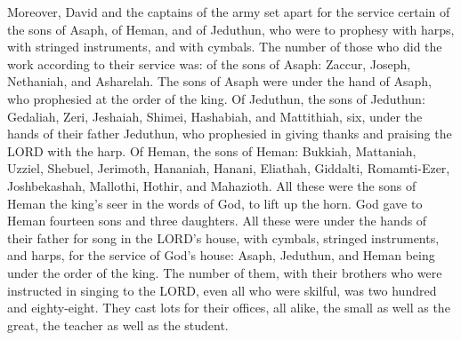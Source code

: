  Moreover, David and the captains of the army set apart for
the service certain of the sons of Asaph, of Heman, and of Jeduthun, who
were to prophesy with harps, with stringed instruments, and with
cymbals. The number of those who did the work according to their service
was:  of the sons of Asaph: Zaccur, Joseph, Nethaniah, and
Asharelah. The sons of Asaph were under the hand of Asaph, who
prophesied at the order of the king.  Of Jeduthun, the sons
of Jeduthun: Gedaliah, Zeri, Jeshaiah, Shimei, Hashabiah, and
Mattithiah, six, under the hands of their father Jeduthun, who
prophesied in giving thanks and praising the LORD with the harp.
 Of Heman, the sons of Heman: Bukkiah, Mattaniah, Uzziel,
Shebuel, Jerimoth, Hananiah, Hanani, Eliathah, Giddalti, Romamti-Ezer,
Joshbekashah, Mallothi, Hothir, and Mahazioth.  All these
were the sons of Heman the king's seer in the words of God, to lift up
the horn. God gave to Heman fourteen sons and three daughters.
 All these were under the hands of their father for song in
the LORD's house, with cymbals, stringed instruments, and harps, for the
service of God's house: Asaph, Jeduthun, and Heman being under the order
of the king.  The number of them, with their brothers who
were instructed in singing to the LORD, even all who were skilful, was
two hundred and eighty-eight.  They cast lots for their
offices, all alike, the small as well as the great, the teacher as well
as the student.

